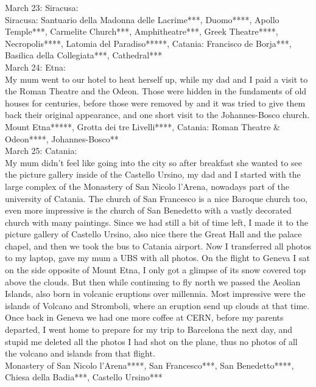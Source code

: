 March 23: Siracusa:\\
Siracusa: Santuario della Madonna delle Lacrime***, Duomo****, Apollo Temple***, Carmelite Church***, Amphitheatre***, Greek Theatre****, Necropolis****, Latomia del Paradiso*****, Catania: Francisco de Borja***, Basilica della Collegiata***, Cathedral***\\

March 24: Etna:\\
My mum went to our hotel to heat herself up, while my dad and I paid a visit to the Roman Theatre and the Odeon. Those were hidden in the fundaments of old houses for centuries, before those were removed by and it was tried to give them back their original appearance, and one short visit to the Johannes-Bosco church.\\

Mount Etna*****, Grotta dei tre Livelli****, Catania: Roman Theatre \& Odeon****, Johannes-Bosco**\\

March 25: Catania:\\
My mum didn't feel like going into the city so after breakfast she wanted to see the picture gallery inside of the Castello Ursino, my dad and I started with the large complex of the Monastery of San Nicolo l'Arena, nowadays part of the university of Catania. The church of San Francesco is a nice Baroque church too, even more impressive is the church of San Benedetto with a vastly decorated church with many paintings. Since we had still a bit of time left, I made it to the picture gallery of Castello Ursino, also nice there the Great Hall and the palace chapel, and then we took the bus to Catania airport. Now I transferred all photos to my laptop, gave my mum a UBS with all photos. On the flight to Geneva I sat on the side opposite of Mount Etna, I only got a glimpse of its snow covered top above the clouds. But then while continuing to fly north we passed the Aeolian Islands, also born in volcanic eruptions over millennia. Most impressive were the islands of Volcano and Stromboli, where an eruption send up clouds at that time. Once back in Geneva we had one more coffee at CERN, before my parents departed, I went home to prepare for my trip to Barcelona the next day, and stupid me deleted all the photos I had shot on the plane, thus no photos of all the volcano and islands from that flight.\\

Monastery of San Nicolo l'Arena****, San Francesco***, San Benedetto****, Chiesa della Badia***, Castello Ursino***

